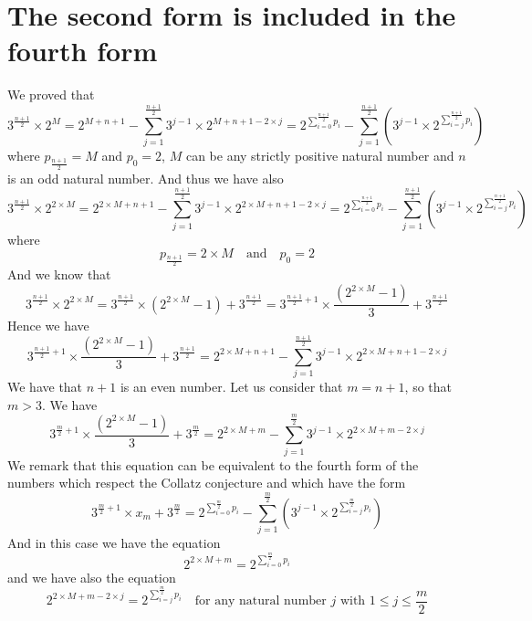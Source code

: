 \documentclass[11pt,a4paper]{article}
\newcommand{\Pf}[4]{2^{\sum_{#4=0}^{#1}#3_{#4}}-\sum_{j=1}^{#2}\left(3^{j-1}\times 2^{\sum_{#4=j}^{#1}#3_{#4}}\right)}
\theoremstyle{definition}
\begin{document}
\section{The second form is included in the fourth form}
We proved that
\begin{equation}
3^{\frac{n+1}{2}}\times 2^{M}=2^{M+n+1}-\sum_{j=1}^{\frac{n+1}{2}}3^{j-1}\times 2^{M+n+1-2\times j}
=\Pf{\frac{n+1}{2}}{\frac{n+1}{2}}{p}{i}
\end{equation}
where $p_{\frac{n+1}{2}}=M$ and $p_0=2$, $M$ can be any strictly positive natural number
and $n$ is an odd natural number. And thus we have also
\begin{equation}
3^{\frac{n+1}{2}}\times 2^{2\times M}=2^{2\times M+n+1}-\sum_{j=1}^{\frac{n+1}{2}}3^{j-1}\times 2^{2\times M+n+1-2\times j}
=\Pf{\frac{n+1}{2}}{\frac{n+1}{2}}{p}{i}
\end{equation}
where
\begin{equation}
p_{\frac{n+1}{2}}=2\times M\quad\text{and}\quad p_0=2
\end{equation}
And we know that
\begin{equation}
3^{\frac{n+1}{2}}\times 2^{2\times M}=3^{\frac{n+1}{2}}\times\left(2^{2\times M}-1\right)+3^{\frac{n+1}{2}}
=3^{\frac{n+1}{2}+1}\times\frac{\left(2^{2\times M}-1\right)}{3}+3^{\frac{n+1}{2}}
\end{equation}
Hence we have
\begin{equation}
3^{\frac{n+1}{2}+1}\times\frac{\left(2^{2\times M}-1\right)}{3}+3^{\frac{n+1}{2}}
=2^{2\times M+n+1}-\sum_{j=1}^{\frac{n+1}{2}}3^{j-1}\times 2^{2\times M+n+1-2\times j}
\end{equation}
We have that $n+1$ is an even number. Let us consider that $m=n+1$, so that $m>3$. We have
\begin{equation}
3^{\frac m2+1}\times\frac{\left(2^{2\times M}-1\right)}{3}+3^{\frac m2}
=2^{2\times M+m}-\sum_{j=1}^{\frac m2}3^{j-1}\times 2^{2\times M+m-2\times j}
\end{equation}
We remark that this equation can be equivalent to the fourth form of the numbers which
respect the Collatz conjecture and which have the form
\begin{equation}
3^{\frac m2+1}\times x_m+3^{\frac m2}=\Pf{\frac m2}{\frac m2}{p}{i}
\end{equation}
And in this case we have the equation
\begin{equation}
2^{2\times M+m}=2^{\sum_{i=0}^{\frac m2}p_i}
\end{equation}
and we have also the equation
\begin{equation}
2^{2\times M+m-2\times j}=2^{\sum_{i=j}^{\frac m2}p_i}\quad\text{for any natural number }j\text{ with }1\le j\le\frac m2
\end{equation}
\end{document}
